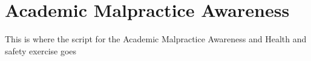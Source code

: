 \chapter{Academic Malpractice Awareness}


\begin{note}
  This is where the script for the Academic Malpractice Awareness and Health and safety exercise goes

\end{note}


